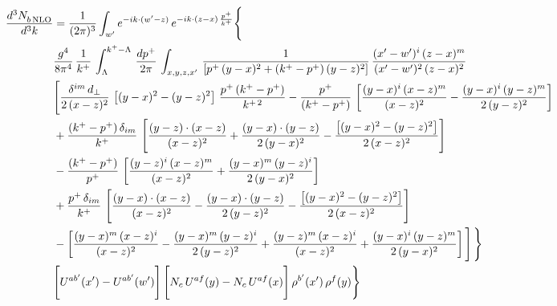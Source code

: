 \documentclass[9pt]{article}
\numberwithin{equation}{section}
\begin{document}
\begin{align}
 \frac{d^{3}N_{b\,\rm NLO}^{\rm}}{d^{3}k}  & =   \frac{1}{(2\pi)^{3}}  \int_{ w^\prime} e^{-ik\cdot(w'-z)}\,e^{-ik\cdot (z-x)\,\frac{p^{+}}{k^{+}}} \Bigg\{\notag \\ & \frac{g^{4}}{8\pi^{4}}\,\frac{1}{k^{+}}\,\int_{\Lambda}^{k^{+}-\Lambda}\, \frac{dp^{+}}{2\pi} \, \int_{x,y,z,x'}\,\frac{1}{\left[p^{+}\,(y-x)^{2}+(k^{+}-p^{+})\,(y-z)^{2}\right]}\, \frac{(x'-w')^{i}\,(z-x)^{m}}{(x'-w')^{2}\,(z-x)^{2}} \notag \\ & \Bigg[\frac{\delta^{im}\,d_{\perp}}{2\,(x-z)^{2}}\,\left[(y-x)^{2}-(y-z)^{2}\right]\,\frac{p^{+}\,(k^{+}-p^{+})}{k^{+\,2}}-\frac{p^{+}}{(k^{+}-p^{+})}\,\left[\frac{(y-x)^{i}\,(x-z)^{m}}{(x-z)^{2}}-\frac{(y-x)^{i}\,(y-z)^{m}}{2\,(y-z)^{2}}\right]\notag \\ & +\frac{(k^{+}-p^{+})\,\delta_{im}}{k^{+}}\,\left[\frac{(y-z)\cdot (x-z)}{(x-z)^{2}}+\frac{(y-x)\cdot (y-z)}{2\,(y-x)^{2}}-\frac{\left[(y-x)^{2}-(y-z)^{2}\right]}{2\,(x-z)^{2}}\right]\notag \\ & -\frac{(k^{+}-p^{+})}{p^{+}}\,\left[\frac{(y-z)^{i}\,(x-z)^{m}}{(x-z)^{2}}+\frac{(y-x)^{m}\,(y-z)^{i}}{2\,(y-x)^{2}}\right]\notag \\ & +\frac{p^{+}\,\delta_{im}}{k^{+}}\,\left[\frac{(y-x)\cdot (x-z)}{(x-z)^{2}}-\frac{(y-x)\cdot (y-z)}{2\,(y-z)^{2}}-\frac{\left[(y-x)^{2}-(y-z)^{2}\right]}{2\,(x-z)^{2}}\right]\notag \\ &-\left[\frac{(y-x)^{m}\,(x-z)^{i}}{(x-z)^{2}}-\frac{(y-x)^{m}\,(y-z)^{i}}{2\,(y-z)^{2}}+\frac{(y-z)^{m}\,(x-z)^{i}}{(x-z)^{2}}+\frac{(y-x)^{i}\,(y-z)^{m}}{2\,(y-x)^{2}}\right]\Bigg]\,\Bigg\} \notag \\ & \Bigg[U^{ab'}(x')-U^{ab'}(w')\Bigg]\,\Bigg[N_{c}\,U^{af}(y) -N_{c}\,U^{af}(x)\Bigg]\,\rho^{b'}(x')\,\rho^{f}(y)\Bigg\}
\end{align}
\end{document}
